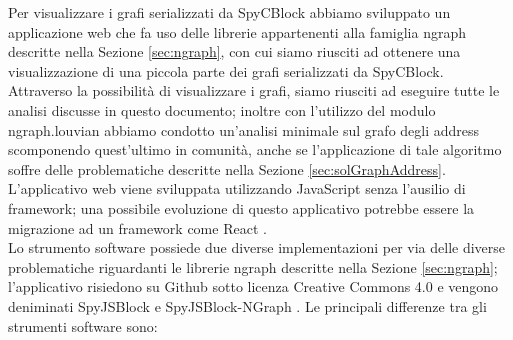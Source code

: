 Per visualizzare i grafi serializzati da SpyCBlock abbiamo sviluppato un applicazione web che fa uso delle librerie appartenenti alla famiglia ngraph descritte nella Sezione \ref{sec:ngraph}, con cui siamo riusciti ad ottenere una visualizzazione di una piccola parte dei grafi serializzati da SpyCBlock.\\
Attraverso la possibilità di visualizzare i grafi, siamo riusciti ad eseguire tutte le analisi discusse in questo documento; inoltre con l'utilizzo del modulo ngraph.louvian abbiamo condotto un'analisi minimale sul grafo degli address scomponendo quest'ultimo in comunità, anche se l'applicazione di tale algoritmo soffre delle problematiche descritte nella Sezione \ref{sec:solGraphAddress}.\\
L'applicativo web viene sviluppata utilizzando JavaScript senza l'ausilio di framework; una possibile evoluzione di questo applicativo potrebbe essere la migrazione ad un framework come React \cite{vis:react}.\\
Lo strumento software possiede due diverse implementazioni per via delle diverse problematiche riguardanti le librerie ngraph descritte nella Sezione \ref{sec:ngraph}; l'applicativo risiedono su Github sotto licenza Creative Commons 4.0 e vengono deniminati SpyJSBlock \cite{vis:SpyJSBlock} e SpyJSBlock-NGraph \cite{vis:SpyJSBlock-Ngraph}.
Le principali differenze tra gli strumenti software sono:
